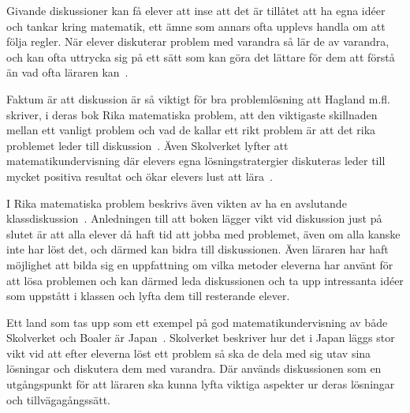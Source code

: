 \textcolor{turkos} {
Givande diskussioner kan få elever att inse att det är tillåtet att ha egna idéer och tankar kring matematik, ett ämne som annars ofta upplevs handla om att följa regler. När elever diskuterar problem med varandra så lär de av varandra, och kan ofta uttrycka sig på ett sätt som kan göra det lättare för dem att förstå än vad ofta läraren kan~\cite{TheElephant}.
}

\textcolor{turkos} {Faktum är att diskussion är så viktigt för bra problemlösning att Hagland m.fl. skriver, i deras bok Rika matematiska problem, att den viktigaste skillnaden mellan ett vanligt problem och vad de kallar ett rikt problem är att det rika problemet leder till diskussion~\cite{RikaProblem}. Även Skolverket lyfter att matematikundervisning där elevers egna lösningstratergier diskuteras leder till mycket positiva resultat och ökar elevers lust att lära~\cite{Skolverket03}.}

\textcolor{turkos}{I Rika matematiska problem beskrivs även vikten av ha en avslutande klassdiskussion~\cite{RikaProblem}. Anledningen till att boken lägger vikt vid diskussion just på slutet är att alla elever då haft tid att jobba med problemet, även om alla kanske inte har löst det, och därmed kan bidra till diskussionen. Även läraren har haft möjlighet att bilda sig en uppfattning om vilka metoder eleverna har använt för att lösa problemen och kan därmed leda diskussionen och ta upp intressanta idéer som uppstått i klassen och lyfta dem till resterande elever.}

\textcolor{turkos} {
Ett land som tas upp som ett exempel på god matematikundervisning av både Skolverket och Boaler är Japan~\cite{TheElephant}\cite{Skolverket03}. Skolverket beskriver hur det i Japan läggs stor vikt vid att efter eleverna löst ett problem så ska de dela med sig utav sina lösningar och diskutera dem med varandra. Där används diskussionen som en utgångspunkt för att läraren ska kunna lyfta viktiga aspekter ur deras lösningar och tillvägagångssätt.}







